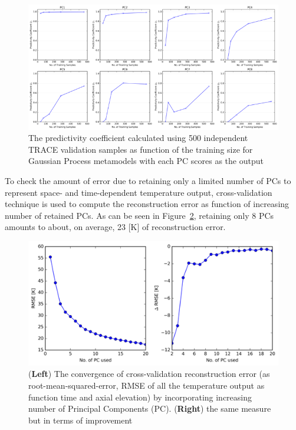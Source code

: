 \documentclass[11pt,titlepage]{article}
\begin{document}
\begin{figure}[h!]
	\centering
	\includegraphics[scale=0.85]{figures/gp_pc_conv.png}
	\caption{The predictivity coefficient calculated using 500 
		independent TRACE validation samples as function of the 
		training size for Gaussian Process metamodels 
		with each PC scores as the output}
	\label{fig:gp_pc_conv}
\end{figure}

To check the amount of error due to retaining only a limited number of PCs to 
represent space- and time-dependent temperature output, cross-validation 
technique is used to compute the reconstruction error as function of 
increasing number of retained PCs. As can be seen in Figure~\ref{fig:rmse}, retaining only 8 PCs amounts to about, on average, 23 [K] of reconstruction 
error.

\begin{figure}[h!]
	\centering
	\includegraphics[scale=0.95]{figures/rmse.png}
	\caption{(\textbf{Left}) The convergence of cross-validation reconstruction
		 error (as root-mean-squared-error, RMSE of all the temperature output as function time and axial elevation) by incorporating increasing 
		 number of Principal Components (PC). (\textbf{Right}) the same 
		 measure but in terms of improvement}
	\label{fig:rmse}
\end{figure}
\end{document}
